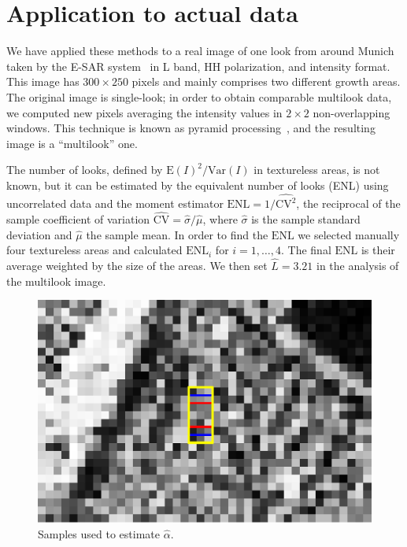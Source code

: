 \documentclass[twocolumn]{svjour3}
\begin{document}
	
	\section{Application to actual data}
	\label{application}
	
	We have applied these methods to a real image of one look from around Munich taken by the E-SAR system~\cite{Horn1996} in L band, HH polarization, and intensity format. 
	This image has $300\times250$ pixels and mainly comprises two different growth areas. 
	The original image is single-look; in order to obtain comparable multilook data, we computed new pixels averaging the intensity values in $2\times2$ non-overlapping windows. This technique is known as pyramid processing~\cite{Adelson1984}, and the resulting image is a ``multilook'' one.
	
	The number of looks, defined by ${\text{E}(I)^2}/{\text{Var}(I)}$ in textureless areas, is not known, but it can be estimated by the equivalent number of looks (ENL) using uncorrelated data and the moment estimator
	$\text{ENL}={1}/{\widehat{\text{CV}^2}}$, the reciprocal of the sample coefficient of variation $\widehat{\text{CV}}={\widehat{\sigma}}/{\widehat\mu}$, where $\widehat{\sigma}$ is the sample standard deviation and $\widehat\mu$ the sample mean.
	In order to find the $\text{ENL}$ we selected manually four textureless areas and calculated $\text{ENL}_i$ for $i=1, \ldots, 4$. 
	The final $\text{ENL}$ is their average weighted by the size of the areas. 
	We then set $\widehat L=3.21$ in the analysis of the multilook image.
	
%	
	\begin{figure}[htb]
		\centering
		\includegraphics[width=0.8\linewidth]{../../../Figures/PaperTesis/TresMuestrasAgrandada.eps}
		\caption{\label{TresMuestras}\small Samples used to estimate $\widehat{\alpha}$.}
	\end{figure}
	
\end{document}
